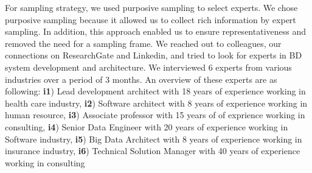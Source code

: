 \documentclass[a4paper,11pt,article,oneside]{memoir}
\begin{document}
For sampling strategy, we used purposive sampling \citep{baltes2022sampling} to select experts. We chose purposive sampling because it allowed us to collect rich information by expert sampling. In addition, this approach enabled us to ensure representativeness and removed the need for a sampling frame. We reached out to colleagues, our connections on ResearchGate and Linkedin, and tried to look for experts in BD system development and architecture. We interviewed 6 experts from various industries over a period of 3 months. An overview of these experts are as following: \textbf{i1}) Lead development architect with 18 years of experience working in health care industry, \textbf{i2}) Software architect with 8 years of experience working in human resource, \textbf{i3}) Associate professor with 15 years of of exprience working in consulting, \textbf{i4}) Senior Data Engineer with 20 years of experience working in Software industry, \textbf{i5}) Big Data Architect with 8 years of experience working in insurance industry, \textbf{i6}) Technical Solution Manager with 40 years of experience working in consulting



      
\end{document}
